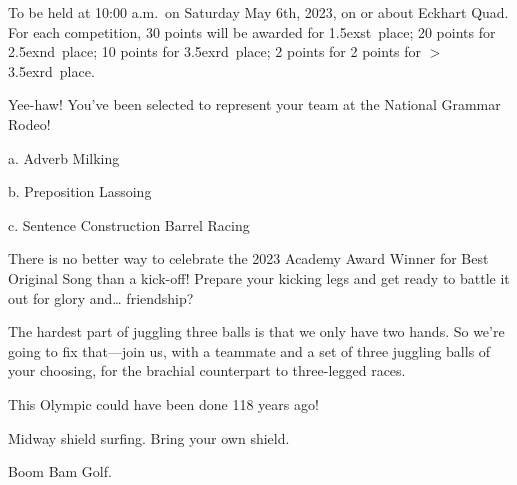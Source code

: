 \documentclass{book}
\def\nd{\raise.5ex\hbox{\scriptsize nd}}
\def\st{\raise.5ex\hbox{\scriptsize st}}
\def\rd{\raise.5ex\hbox{\scriptsize rd}}
\begin{document}
To be held at 10:00 a.m.\ on Saturday May 6th, 2023, on or about Eckhart Quad.
For each competition, 30 points will be awarded for 1\st\ place; 20 points for
2\nd\ place; 10 points for 3\rd\ place; 2 points for 2 points for $>$ 3\rd\ place.
\begin{list}{}{}

\item Yee-haw! You’ve been selected to represent your team at the National Grammar Rodeo!

a. Adverb Milking

b. Preposition Lassoing

c. Sentence Construction Barrel Racing

\item There is no better way to celebrate the 2023 Academy Award Winner for Best Original Song than a kick-off! Prepare your kicking legs and get ready to battle it out for glory and… friendship?
\item The hardest part of juggling three balls is that we only have two hands. So we’re going to fix that---join us, with a teammate and a set of three juggling balls of your choosing, for the brachial counterpart to three-legged races.
\item This Olympic could have been done 118 years ago!
\item Midway shield surfing. Bring your own shield.
\item Boom Bam Golf.
\end{list}
\newpage
\pagestyle{plain}
 \setcounter{page}{1}
\end{document}
